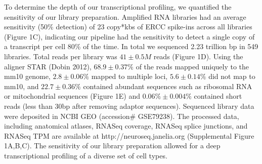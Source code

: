 To determine the depth of our transcriptional profiling, we quantified the sensitivity of our library preparation. Amplified RNA libraries had an average sensitivity (50\% detection) of 23 copy*kbs of ERCC spike-ins across all libraries (Figure 1C), indicating our pipeline had the sensitivity to detect a single copy of a transcript per cell 80\% of the time. In total we sequenced 2.23 trillion bp in 549 libraries. Total reads per library was $41\pm0.5M$ reads (Figure 1D). Using the aligner STAR (Dobin 2012), $68.9\pm0.37\%$ of the reads mapped uniquely to the mm10 genome, $2.8\pm0.06\%$ mapped to multiple loci, $5.6\pm0.14\%$ did not map to mm10, and $22.7\pm0.36\%$ contained abundant sequences such as ribosomal RNA or mitochondrial sequences (Figure 1E) and $0.06\%\pm 0.004\%$ contained short reads (less than 30bp after removing adaptor sequences). Sequenced library data were deposited in NCBI GEO (accession\# GSE79238). The processed data, including anatomical atlases, RNASeq coverage, RNASeq splice junctions, and RNASeq TPM are available at http://neuroseq.janelia.org (Supplemental Figure 1A,B,C). The sensitivity of our library preparation allowed for a deep transcriptional profiling of a diverse set of cell types.


